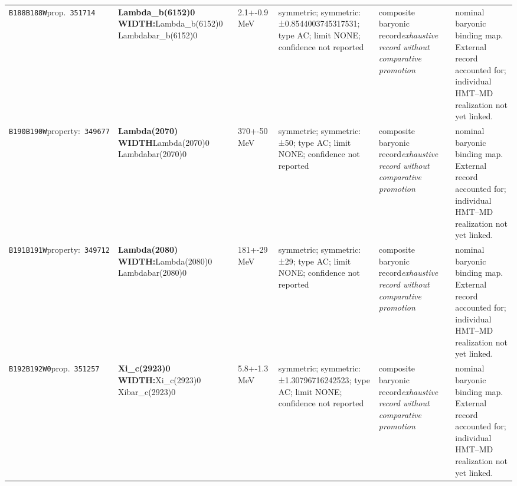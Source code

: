 \begin{landscape}
\begin{longtable}{L{1.85cm}L{4.45cm}L{2.35cm}L{4.05cm}L{3.35cm}L{7.15cm}}
\texttt{B188}\newline \texttt{B188W}\newline prop.\ \texttt{351714} & \textbf{Lambda\_\allowbreak{}b(6152)0 WIDTH:}\newline Lambda\_\allowbreak{}b(6152)0 \textbar{}\allowbreak{} Lambdabar\_\allowbreak{}b(6152)0 & 2.1+-0.9\,MeV & symmetric; symmetric: ±0.8544003745317531; type AC; limit NONE; confidence not reported & composite baryonic record\newline \emph{exhaustive record without comparative promotion} & nominal baryonic binding map. External record accounted for; individual HMT--MD realization not yet linked. \\
\texttt{B190}\newline \texttt{B190W}\newline property:\ \texttt{349677} & \textbf{Lambda(2070) WIDTH}\newline Lambda(2070)0 \textbar{}\allowbreak{} Lambdabar(2070)0 & 370+-50\,MeV & symmetric; symmetric: ±50; type AC; limit NONE; confidence not reported & composite baryonic record\newline \emph{exhaustive record without comparative promotion} & nominal baryonic binding map. External record accounted for; individual HMT--MD realization not yet linked. \\
\texttt{B191}\newline \texttt{B191W}\newline property:\ \texttt{349712} & \textbf{Lambda(2080) WIDTH:}\newline Lambda(2080)0 \textbar{}\allowbreak{} Lambdabar(2080)0 & 181+-29\,MeV & symmetric; symmetric: ±29; type AC; limit NONE; confidence not reported & composite baryonic record\newline \emph{exhaustive record without comparative promotion} & nominal baryonic binding map. External record accounted for; individual HMT--MD realization not yet linked. \\
\texttt{B192}\newline \texttt{B192W0}\newline prop.\ \texttt{351257} & \textbf{Xi\_\allowbreak{}c(2923)0 WIDTH:}\newline Xi\_\allowbreak{}c(2923)0 \textbar{}\allowbreak{} Xibar\_\allowbreak{}c(2923)0 & 5.8+-1.3\,MeV & symmetric; symmetric: ±1.30796716242523; type AC; limit NONE; confidence not reported & composite baryonic record\newline \emph{exhaustive record without comparative promotion} & nominal baryonic binding map. External record accounted for; individual HMT--MD realization not yet linked. \\

\end{longtable}
\end{landscape}
